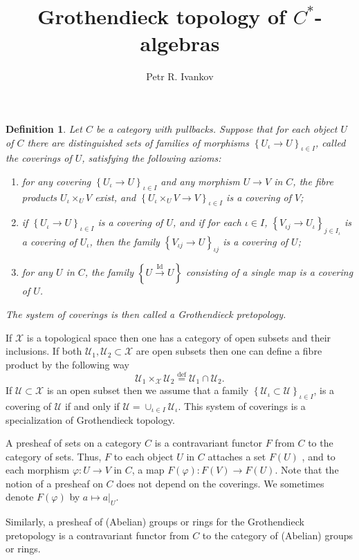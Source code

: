 \documentclass{beamer}
\title{Grothendieck topology of  $C^*$-algebras}
\institute
{
Algebras in analysis
}
\author{Petr R. Ivankov  }
\theoremstyle{plain}
\newtheorem{defn}{Definition}
\newcommand{\Id}{\mathrm{Id}}
\newcommand{\sU}{\mathcal{U}}       %
\newcommand{\sX}{\mathcal{X}}       %
\newcommand{\bydef}{\stackrel{\mathrm{def}}{=}}
\begin{document}

\begin{frame}
  \titlepage
\end{frame}
\begin{frame}
	\begin{defn}
		Let  $C$  be a category with pullbacks. Suppose that  for each object $U$ of $C$ there are  distinguished sets of families of morphisms $\left\{U_\iota \to U\right\}_{\iota\in I}$, called the \textit{coverings} of $U$, 
		satisfying the following axioms: 
		\begin{enumerate}
			\item[(a)] for any covering $\left\{U_\iota \to U\right\}_{\iota\in I}$ and any morphism $U \to V$ in $ C$, the fibre products 
			$U_\iota\times_U V$ exist, and $\left\{U_\iota\times_U V \to V\right\}_{\iota\in I}$ is a covering of $V$; 
			\item[(b)] if $\left\{U_\iota \to U \right\}_{\iota\in I}$ is a covering of $U$, and if for each $\iota \in I$, $\left\{V_{\iota j} \to U_\iota  \right\}_{j \in I_\iota}$	is a 
			covering of $U_\iota$, then the family $\left\{V_{\iota j }\to U\right\}_{\iota j}$ is a covering of $U$; 
			\item[(c)] for any $U$ in $C$, the family $\left\{U\xrightarrow{\Id}U \right\}$ consisting of a single map is a covering of $U$. 
		\end{enumerate}
		The system of coverings is then called a \alert{Grothendieck pretopology}.
		\end{defn}
\end{frame}
\begin{frame}
		\begin{example}\label{top_gro_exm}
		If $\sX$ is a topological space then one has a category of open subsets and their inclusions. If both $\sU_1, \sU_2 \subset \sX$ are open subsets then one can define a fibre product  by the following way
		$$
		\sU_1\times_\sX \sU_2 \bydef \sU_1 \cap \sU_2.	
		$$
		If $\sU \subset \sX$ is an open subset then we assume that a family  $\left\{\sU_\iota \subset \sU\right\}_{\iota\in I}$, is a covering of $\sU$ if and only if  $\sU = \cup_{\iota\in I}\sU_\iota$. This system of coverings is a specialization of Grothendieck topology. 
	\end{example}
\end{frame}
\begin{frame}
	\begin{definition}\label{etale_presheaf_defn}
	A \alert{presheaf of sets} on a category $ C$
	is a contravariant functor $ F$ from $ C$ to the category of sets. Thus,  $ F$
	to each object $U$ in $ C$ 
	attaches a set $ F\left(U \right)$ , and to each morphism $\varphi: U \to V$
	in $ C$, a map $ F\left(\varphi\right): F\left(V \right)\to  F\left(U \right)$. Note that the notion of a presheaf on $ C$ 
	does not depend on the 
	coverings. We sometimes denote $ F\left(\varphi\right)$ by $a \mapsto a|_U$.
	
\end{definition}
Similarly, a presheaf of (Abelian) groups or rings for the Grothendieck pretopology is a contravariant functor from
$ C$ to the category of (Abelian) groups or rings.
\end{frame}
\end{document}
